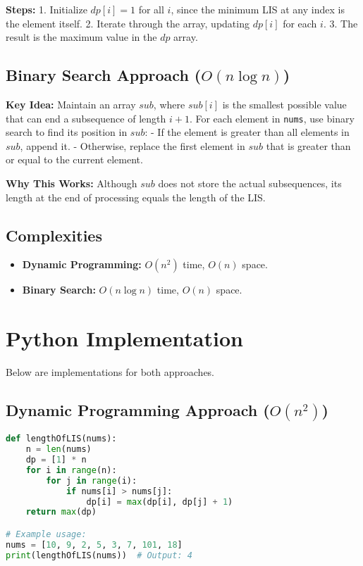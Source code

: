 \textbf{Steps:}
1. Initialize \(dp[i] = 1\) for all \(i\), since the minimum LIS at any index is the element itself.
2. Iterate through the array, updating \(dp[i]\) for each \(i\).
3. The result is the maximum value in the \(dp\) array.

\subsection*{Binary Search Approach (\(O(n \log n)\))}
\textbf{Key Idea:}
Maintain an array \(sub\), where \(sub[i]\) is the smallest possible value that can end a subsequence of length \(i+1\). For each element in \texttt{nums}, use binary search to find its position in \(sub\):
- If the element is greater than all elements in \(sub\), append it.
- Otherwise, replace the first element in \(sub\) that is greater than or equal to the current element.

\textbf{Why This Works:}
Although \(sub\) does not store the actual subsequences, its length at the end of processing equals the length of the LIS.

\subsection*{Complexities}
\begin{itemize}
    \item \textbf{Dynamic Programming:} \(O(n^2)\) time, \(O(n)\) space.
    \item \textbf{Binary Search:} \(O(n \log n)\) time, \(O(n)\) space.
\end{itemize}

\section*{Python Implementation}
Below are implementations for both approaches.

\subsection*{Dynamic Programming Approach (\(O(n^2)\))}
\begin{fullwidth}
\begin{lstlisting}[language=Python]
def lengthOfLIS(nums):
    n = len(nums)
    dp = [1] * n
    for i in range(n):
        for j in range(i):
            if nums[i] > nums[j]:
                dp[i] = max(dp[i], dp[j] + 1)
    return max(dp)

# Example usage:
nums = [10, 9, 2, 5, 3, 7, 101, 18]
print(lengthOfLIS(nums))  # Output: 4
\end{lstlisting}
\end{fullwidth}

